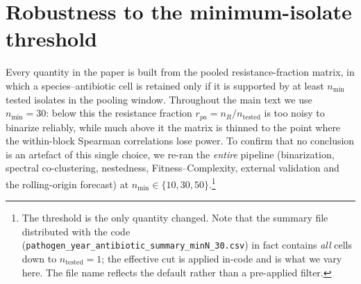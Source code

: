 %
%        
\providecommand{\rca}{\mathrm{RCA}}
\providecommand{\N}{\mathcal{N}}
\providecommand{\I}{\mathcal{I}}

\appendix

\section{Robustness to the minimum-isolate threshold}
\label{app:minN}
Every quantity in the paper is built from the pooled resistance-fraction matrix, in which a
species--antibiotic cell is retained only if it is supported by at least $n_{\min}$ tested isolates
in the pooling window. Throughout the main text we use $n_{\min}=30$: below this the resistance
fraction $r_{pa}=n_R/n_{\text{tested}}$ is too noisy to binarize reliably, while much above it the
matrix is thinned to the point where the within-block Spearman correlations lose power. To confirm
that no conclusion is an artefact of this single choice, we re-ran the \emph{entire} pipeline
(binarization, spectral co-clustering, nestedness, Fitness--Complexity, external validation and the
rolling-origin forecast) at $n_{\min}\in\{10,30,50\}$.\footnote{The threshold is the only quantity
changed. Note that the summary file distributed with the code
(\texttt{pathogen\_year\_antibiotic\_summary\_minN\_30.csv}) in fact contains \emph{all} cells down
to $n_{\text{tested}}=1$; the effective cut is applied in-code and is what we vary here. The file
name reflects the default rather than a pre-applied filter.}

